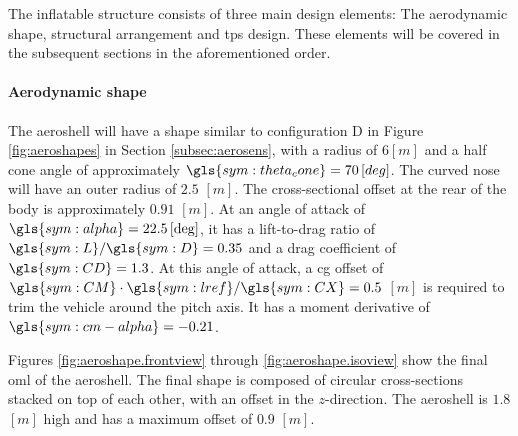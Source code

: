 The inflatable structure consists of three main design elements: The aerodynamic shape, structural arrangement and \gls{tps} design. These elements will be covered in the subsequent sections in the aforementioned order.

\paragraph{Aerodynamic shape}
The aeroshell will have a shape similar to configuration D in Figure \ref{fig:aeroshapes} in Section \ref{subsec:aerosens}, with a radius of $6 \left[m\right]$ and a half cone angle of approximately $\gls{sym:theta_cone} = 70 \left[deg\right]$. The curved nose will have an outer radius of $2.5$ $\left[m\right]$. The cross-sectional offset at the rear of the body is approximately $0.91$ $\left[m\right]$. At an angle of attack of $\gls{sym:alpha} = 22.5 \left[\deg\right]$, it has a lift-to-drag ratio of $\gls{sym:L}/\gls{sym:D} = 0.35$ and a drag coefficient of $\gls{sym:CD} = 1.3$. At this angle of attack, a \gls{cg} offset of $\gls{sym:CM}\cdot \gls{sym:lref}/\gls{sym:CX} = 0.5$ $\left[m\right]$ is required to trim the vehicle around the pitch axis. It has a moment derivative of $\gls{sym:cm-alpha} = -0.21$. 

 Figures \ref{fig:aeroshape.frontview} through \ref{fig:aeroshape.isoview} show the final \gls{oml} of the aeroshell. The final shape is composed of circular cross-sections stacked on top of each other, with an offset in the $z$-direction. The aeroshell is $1.8$ $\left[m\right]$ high and has a maximum offset of $0.9$ $\left[m\right]$.
 
